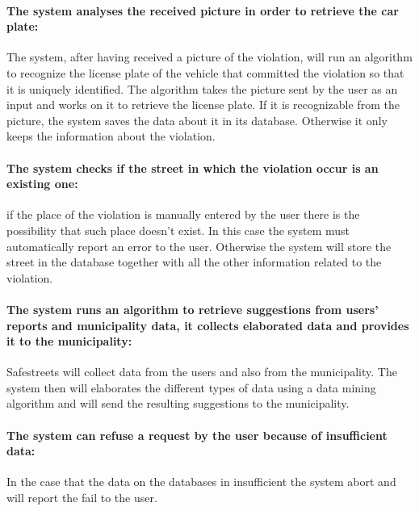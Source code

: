 \documentclass[titlepage]{article}
\begin{document}
\paragraph{The system analyses the received picture in order to 	retrieve the car plate: }
The system, after having received a picture of the violation, will run an algorithm to recognize the license plate of the vehicle that committed the violation so that it is uniquely identified. The algorithm takes the picture sent by the user as an input and works on it to retrieve the license plate. If it is recognizable from the picture, the system saves the data about it in its database. Otherwise it only keeps the information about the violation.
\paragraph{The system checks if the street in which the 				violation occur is an existing one: }
if the place of the violation is manually entered by the user there is the possibility that such place doesn't exist. In this case the system must automatically report an error to the user. Otherwise the system will store the street in the database together with all the other information related to the violation.
\paragraph{The system runs an algorithm to retrieve suggestions from users' reports and municipality data, it collects elaborated data and provides it to the municipality: }
Safestreets will collect data from the users and also from the municipality. The system then will elaborates the different types of data using a data mining algorithm and will send the resulting suggestions to the municipality. 
\paragraph{The system can refuse a request by the user because of 
	insufficient data:}
	In the case that the data on the databases in insufficient the system abort and will report the fail to the 
	user.
\end{document}
